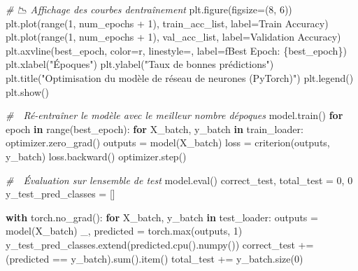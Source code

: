 \documentclass[
]{article}
\newenvironment{Shaded}{}{}
\newcommand{\BuiltInTok}[1]{\textcolor[rgb]{0.00,0.50,0.00}{#1}}
\newcommand{\CommentTok}[1]{\textcolor[rgb]{0.38,0.63,0.69}{\textit{#1}}}
\newcommand{\ControlFlowTok}[1]{\textcolor[rgb]{0.00,0.44,0.13}{\textbf{#1}}}
\newcommand{\DecValTok}[1]{\textcolor[rgb]{0.25,0.63,0.44}{#1}}
\newcommand{\KeywordTok}[1]{\textcolor[rgb]{0.00,0.44,0.13}{\textbf{#1}}}
\newcommand{\NormalTok}[1]{#1}
\newcommand{\OperatorTok}[1]{\textcolor[rgb]{0.40,0.40,0.40}{#1}}
\newcommand{\SpecialCharTok}[1]{\textcolor[rgb]{0.25,0.44,0.63}{#1}}
\newcommand{\SpecialStringTok}[1]{\textcolor[rgb]{0.73,0.40,0.53}{#1}}
\newcommand{\StringTok}[1]{\textcolor[rgb]{0.25,0.44,0.63}{#1}}
\begin{document}
\begin{Shaded}
\begin{Highlighting}[]
\CommentTok{\# 📉 Affichage des courbes d\textquotesingle{}entraînement}
\NormalTok{plt.figure(figsize}\OperatorTok{=}\NormalTok{(}\DecValTok{8}\NormalTok{, }\DecValTok{6}\NormalTok{))}
\NormalTok{plt.plot(}\BuiltInTok{range}\NormalTok{(}\DecValTok{1}\NormalTok{, num\_epochs }\OperatorTok{+} \DecValTok{1}\NormalTok{), train\_acc\_list, label}\OperatorTok{=}\StringTok{\textquotesingle{}Train Accuracy\textquotesingle{}}\NormalTok{)}
\NormalTok{plt.plot(}\BuiltInTok{range}\NormalTok{(}\DecValTok{1}\NormalTok{, num\_epochs }\OperatorTok{+} \DecValTok{1}\NormalTok{), val\_acc\_list, label}\OperatorTok{=}\StringTok{\textquotesingle{}Validation Accuracy\textquotesingle{}}\NormalTok{)}
\NormalTok{plt.axvline(best\_epoch, color}\OperatorTok{=}\StringTok{\textquotesingle{}r\textquotesingle{}}\NormalTok{, linestyle}\OperatorTok{=}\StringTok{\textquotesingle{}{-}{-}\textquotesingle{}}\NormalTok{, label}\OperatorTok{=}\SpecialStringTok{f\textquotesingle{}Best Epoch: }\SpecialCharTok{\{}\NormalTok{best\_epoch}\SpecialCharTok{\}}\SpecialStringTok{\textquotesingle{}}\NormalTok{)}
\NormalTok{plt.xlabel(}\StringTok{"Époques"}\NormalTok{)}
\NormalTok{plt.ylabel(}\StringTok{"Taux de bonnes prédictions"}\NormalTok{)}
\NormalTok{plt.title(}\StringTok{"Optimisation du modèle de réseau de neurones (PyTorch)"}\NormalTok{)}
\NormalTok{plt.legend()}
\NormalTok{plt.show()}

\CommentTok{\# 🔄 Ré{-}entraîner le modèle avec le meilleur nombre d\textquotesingle{}époques}
\NormalTok{model.train()}
\ControlFlowTok{for}\NormalTok{ epoch }\KeywordTok{in} \BuiltInTok{range}\NormalTok{(best\_epoch):}
    \ControlFlowTok{for}\NormalTok{ X\_batch, y\_batch }\KeywordTok{in}\NormalTok{ train\_loader:}
\NormalTok{        optimizer.zero\_grad()}
\NormalTok{        outputs }\OperatorTok{=}\NormalTok{ model(X\_batch)}
\NormalTok{        loss }\OperatorTok{=}\NormalTok{ criterion(outputs, y\_batch)}
\NormalTok{        loss.backward()}
\NormalTok{        optimizer.step()}

\CommentTok{\# 🎯 Évaluation sur l\textquotesingle{}ensemble de test}
\NormalTok{model.}\BuiltInTok{eval}\NormalTok{()}
\NormalTok{correct\_test, total\_test }\OperatorTok{=} \DecValTok{0}\NormalTok{, }\DecValTok{0}
\NormalTok{y\_test\_pred\_classes }\OperatorTok{=}\NormalTok{ []}

\ControlFlowTok{with}\NormalTok{ torch.no\_grad():}
    \ControlFlowTok{for}\NormalTok{ X\_batch, y\_batch }\KeywordTok{in}\NormalTok{ test\_loader:}
\NormalTok{        outputs }\OperatorTok{=}\NormalTok{ model(X\_batch)}
\NormalTok{        \_, predicted }\OperatorTok{=}\NormalTok{ torch.}\BuiltInTok{max}\NormalTok{(outputs, }\DecValTok{1}\NormalTok{)}
\NormalTok{        y\_test\_pred\_classes.extend(predicted.cpu().numpy())}
\NormalTok{        correct\_test }\OperatorTok{+=}\NormalTok{ (predicted }\OperatorTok{==}\NormalTok{ y\_batch).}\BuiltInTok{sum}\NormalTok{().item()}
\NormalTok{        total\_test }\OperatorTok{+=}\NormalTok{ y\_batch.size(}\DecValTok{0}\NormalTok{)}


\end{Highlighting}
\end{Shaded}
\end{document}
